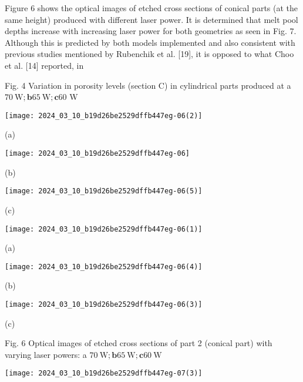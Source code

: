 \documentclass[10pt]{article}
\begin{document}
Figure 6 shows the optical images of etched cross sections of conical parts (at the same height) produced with different laser power. It is determined that melt pool depths increase with increasing laser power for both geometries as seen in Fig. 7. Although this is predicted by both models implemented and also consistent with previous studies mentioned by Rubenchik et al. [19], it is opposed to what Choo et al. [14] reported, in

Fig. 4 Variation in porosity levels (section C) in cylindrical parts produced at a $70 \mathrm{~W} ; \mathbf{b} 65 \mathrm{~W} ; \mathbf{c} 60$ W

\begin{center}
\texttt{[image: 2024\_03\_10\_b19d26be2529dffb447eg-06(2)]}
\end{center}

(a)

\begin{center}
\texttt{[image: 2024\_03\_10\_b19d26be2529dffb447eg-06]}
\end{center}

(b)

\begin{center}
\texttt{[image: 2024\_03\_10\_b19d26be2529dffb447eg-06(5)]}
\end{center}

(c)

\begin{center}
\texttt{[image: 2024\_03\_10\_b19d26be2529dffb447eg-06(1)]}
\end{center}

(a)

\begin{center}
\texttt{[image: 2024\_03\_10\_b19d26be2529dffb447eg-06(4)]}
\end{center}

(b)

\begin{center}
\texttt{[image: 2024\_03\_10\_b19d26be2529dffb447eg-06(3)]}
\end{center}

(c)

Fig. 6 Optical images of etched cross sections of part 2 (conical part) with varying laser powers: a $70 \mathrm{~W} ; \mathbf{b} 65 \mathrm{~W} ; \mathbf{c} 60 \mathrm{~W}$

\begin{center}
\texttt{[image: 2024\_03\_10\_b19d26be2529dffb447eg-07(3)]}
\end{center}
\end{document}

